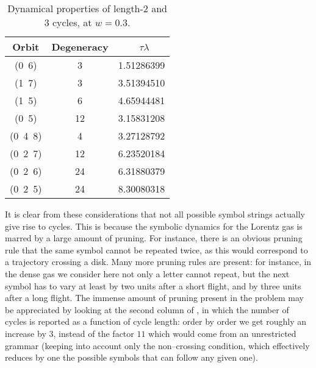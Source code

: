 {%
%
%
\begin{table}
{\small
\begin{tabular}{|c|c|c|}
\hline
Orbit & Degeneracy & ~$\tau \lambda$ \\ \hline\hline
(0~6)    & 3      & 1.51286399  \\
(1~7)    & 3      & 3.51394510  \\
(1~5)    & 6      & 4.65944481  \\
(0~5)    & 12     & 3.15831208  \\
(0~4~8) & 4      & 3.27128792  \\
(0~2~7) & 12     & 6.23520184  \\
(0~2~6) & 24     & 6.31880379  \\
(0~2~5) & 24     & 8.30080318  \\ \hline\hline
\end{tabular}
\caption[]{\small
Dynamical properties of length-2 and 3 cycles, at $w=0.3$.
}
\label{t-diff-1}
}  %
\end{table}
%

It is clear from these considerations that not all possible symbol
strings actually give rise to cycles. This is because the symbolic
dynamics for the Lorentz gas is marred by a large amount of pruning.
For instance,
there is an obvious pruning rule that the same symbol
cannot be repeated twice,
as this would correspond to a trajectory crossing a disk.
Many more pruning rules are present: for instance, in the dense gas we
consider here not only a letter cannot repeat, but the next symbol has to vary
at least by two units after a short flight, and by three units after a long
flight. The immense amount of pruning present in the problem may be
appreciated by looking at the second column of
,
in which the
number of cycles is reported as a function of cycle length: order by
order we get roughly an increase by $3$, instead of the factor $11$
which would come from an unrestricted grammar (keeping into account
only the non--crossing condition, which effectively reduces by one
the possible symbols that can follow any given one).


}
